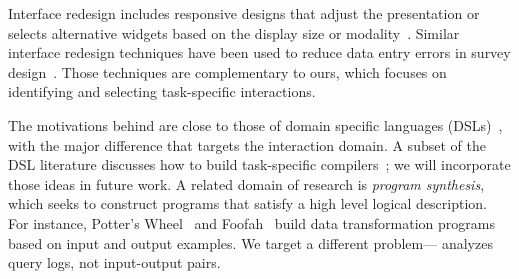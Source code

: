   Interface redesign includes responsive designs that adjust the presentation or selects alternative widgets based on the display size or modality~\cite{adaptive1993}. Similar interface redesign techniques have been used to reduce data entry errors in survey design~\cite{kuangusher}. Those techniques are complementary to ours, which focuses on identifying and selecting task-specific interactions.

 The motivations behind \sys{} are close to those of domain specific languages (DSLs)~\cite{hudak1997domain}, with the major difference that \sys{} targets the interaction domain. A subset of the DSL literature discusses how to build task-specific compilers~\cite{cleaveland1988building}; we will incorporate those ideas in future work.
A related domain of research is \emph{program synthesis}, which seeks to construct programs that satisfy a high level logical description. For instance, Potter's Wheel~\cite{raman2001potter} and Foofah~\cite{jin2017foofah} build data transformation programs based on input and output examples. We target a different problem---\sys{} analyzes query logs, not  input-output pairs.